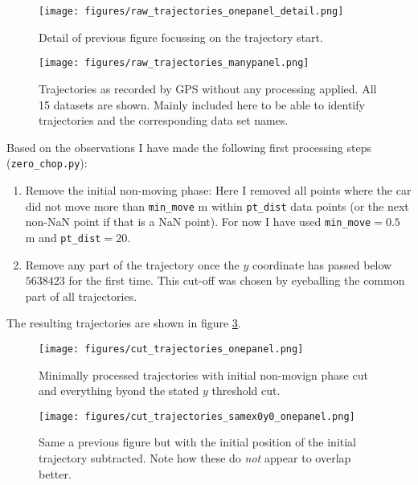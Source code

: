 \documentclass[a4]{article}
\begin{document}
\begin{figure}\begin{center}
  \texttt{[image: figures/raw\_trajectories\_onepanel\_detail.png]}
  \caption{\label{fig:rawTrajDetail} Detail of previous figure focussing on
    the trajectory start.}
\end{center}\end{figure}

\begin{figure}\begin{center}
  \texttt{[image: figures/raw\_trajectories\_manypanel.png]}
  \caption{\label{fig:rawTraj2} Trajectories as recorded by GPS
    without any processing applied. All 15 datasets are shown. Mainly
    included here to be able to identify trajectories and the
    corresponding data set names.}
\end{center}\end{figure}

Based on the observations I have made the following first processing
steps (\verb+zero_chop.py+):
\begin{enumerate}
  \item Remove the initial non-moving phase: Here I removed all points
    where the car did not move more than \verb+min_move+ m within
    \verb+pt_dist+ data points (or the next non-NaN point if that is a
    NaN point). For now I have used \verb+min_move+$= 0.5$ m and
    \verb+pt_dist+$= 20$.
  \item Remove any part of the trajectory once the $y$ coordinate has
    passed below $5638423$ for the first time. This cut-off was chosen
    by eyeballing the common part of all trajectories.
\end{enumerate}
The resulting trajectories are shown in figure \ref{fig:procTraj1}.
\begin{figure}\begin{center}
  \texttt{[image: figures/cut\_trajectories\_onepanel.png]}
  \caption{\label{fig:procTraj1} Minimally processed trajectories with
  initial non-movign phase cut and everything byond the stated $y$
  threshold cut.}
\end{center}\end{figure}

\begin{figure}\begin{center}
  \texttt{[image: figures/cut\_trajectories\_samex0y0\_onepanel.png]}
  \caption{\label{fig:procTraj2} Same a previous figure but with the
    initial position of the initial trajectory subtracted. Note how
    these do {\em not} appear to overlap better.}
\end{center}\end{figure}
\end{document}
